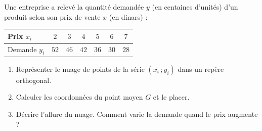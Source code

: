 
\newcommand{\R}{\mathbb{R}}
\newcommand{\vect}[1]{\overrightarrow{#1}}

Une entreprise a relevé la quantité demandée $y$ (en centaines d'unités) d'un produit selon son prix de vente $x$ (en dinars) :
\begin{center}
\begin{tabular}{|l|c|c|c|c|c|c|}\hline
Prix $x_i$ & $2$ & $3$ & $4$ & $5$ & $6$ & $7$ \\\hline
Demande $y_i$ & $52$ & $46$ & $42$ & $36$ & $30$ & $28$ \\\hline
\end{tabular}\end{center}
\begin{enumerate}
  \item Représenter le nuage de points de la série $(x_i\,;y_i)$ dans un repère orthogonal.
  \item Calculer les coordonnées du point moyen $G$ et le placer.
  \item Décrire l'allure du nuage. Comment varie la demande quand le prix augmente ?
\end{enumerate}

